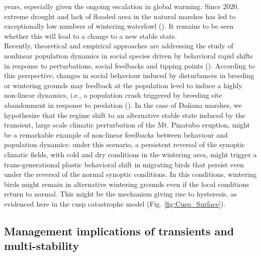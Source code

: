 \documentclass[12pt]{article}
\begin{document}
years, especially given the ongoing escalation in global warming. Since 2020, extreme drought and lack of flooded area in the natural marshes has led to exceptionally low numbers of wintering waterfowl (\cite{Camacho2022,Fox2023}). It remains to be seen whether this will lead to a change to a new stable state.\\

Recently, theoretical and empirical approaches are addressing the study of nonlinear population dynamics in social species driven by behavioral rapid shifts in response to perturbations, social feedbacks and tipping points (\cite{Oro2020a,Oro2023}). According to this perspective, changes in social behaviour induced by disturbances in breeding or wintering grounds may feedback at the population level to induce a highly non-linear dynamics, i.e., a population crash triggered by breeding site abandonment in response to predation (\cite{Almaraz2011,Oro2023}). In the case of Doñana marshes, we hypothesize that the regime shift to an alternative stable state induced by the transient, large scale climatic perturbation of the Mt. Pinatubo eruption, might be a remarkable example of non-linear feedbacks between behaviour and population dynamics: under this scenario, a persistent reversal of the synoptic climatic fields, with cold and dry conditions in the wintering area, might trigger a trans-generational plastic behavioral shift in migrating birds that persist even under the reversal of the normal synoptic conditions. In this conditions, wintering birds might remain in alternative wintering grounds even if the local conditions return to normal. This might be the mechanism giving rise to hysteresis, as evidenced here in the cusp catastrophe model (Fig. \ref{fig:Cusp_Surface}).\\

\subsection*{Management implications of transients and multi-stability}
\label{sec:Management implications of transients and multi-stability}
\end{document}

